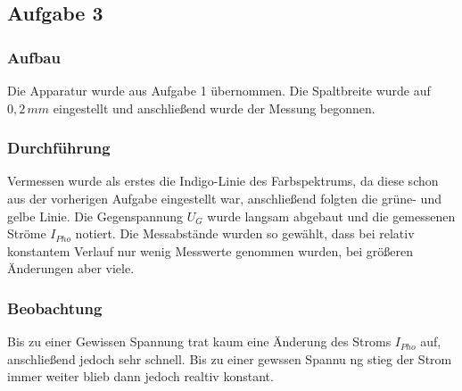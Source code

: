\subsection{Aufgabe 3}
\subsubsection{Aufbau}
Die Apparatur wurde aus Aufgabe 1 übernommen. Die Spaltbreite wurde auf \(0,2\,mm\) eingestellt und anschließend wurde der Messung begonnen.
\subsubsection{Durchführung}
Vermessen wurde als erstes die Indigo-Linie des Farbspektrums, da diese schon aus der vorherigen Aufgabe eingestellt war, anschließend folgten die grüne- und gelbe Linie. Die Gegenspannung \(U_G\) wurde langsam abgebaut und die gemessenen Ströme \(I_{Pho}\) notiert. Die Messabstände wurden so gewählt, dass bei relativ konstantem Verlauf nur wenig Messwerte genommen wurden, bei größeren Änderungen aber viele.
\subsubsection{Beobachtung}
Bis zu einer Gewissen Spannung trat kaum eine Änderung des Stroms \(I_{Pho}\) auf, anschließend jedoch sehr schnell. Bis zu einer gewssen Spannu ng stieg der Strom immer weiter blieb dann jedoch realtiv konstant.
